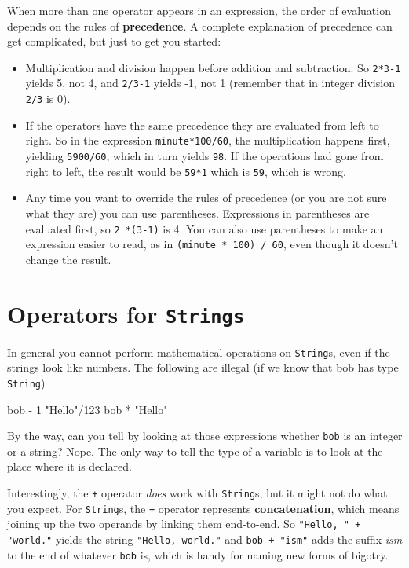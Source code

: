 \documentclass[12pt]{book}
\theoremstyle{exercise}
\begin{document}
When more than one operator appears in an expression, the order
of evaluation depends on the rules of {\bf precedence}.  A
complete explanation of precedence can get complicated, but
just to get you started:

\begin{itemize}

\item Multiplication and division happen before
addition and subtraction.  So {\tt 2*3-1} yields 5, not 4, and
{\tt 2/3-1} yields -1, not 1 (remember that in integer division
{\tt 2/3} is 0).

\item If the operators have the same precedence they are evaluated
from left to right.  So in the expression {\tt minute*100/60},
the multiplication happens first, yielding {\tt 5900/60}, which
in turn yields {\tt 98}.  If the operations had gone from right
to left, the result would be {\tt 59*1} which is {\tt 59}, which
is wrong.

\item Any time you want to override the rules of precedence (or
you are not sure what they are) you can use parentheses.  Expressions
in parentheses are evaluated first, so {\tt 2 *(3-1)} is 4.
You can also use parentheses to make an expression easier to
read, as in {\tt(minute * 100) / 60}, even though it doesn't
change the result.

\end{itemize}


\section{Operators for {\tt Strings}}

In general you cannot perform mathematical operations on {\tt String}s,
even if the strings look like numbers.  The following are
illegal (if we know that bob has type {\tt String})

\begin{verbatimtab}
bob - 1         "Hello"/123      bob * "Hello"
\end{verbatimtab}
%
By the way, can you tell by looking at those expressions
whether {\tt bob} is an integer or a string?  Nope.
The only way to tell the type of a variable is to look at
the place where it is declared.


Interestingly, the {\tt +} operator {\em does} work with
{\tt String}s, but it might not do what you expect.
For {\tt String}s, the {\tt +} operator represents {\bf concatenation},
which means joining up the two operands by linking them
end-to-end.  So {\tt "Hello, " + "world."} yields the string
{\tt "Hello, world."} and {\tt bob + "ism"} adds the suffix
{\em ism} to the end of whatever {\tt bob} is, which is
handy for naming new forms of bigotry.
\end{document}
